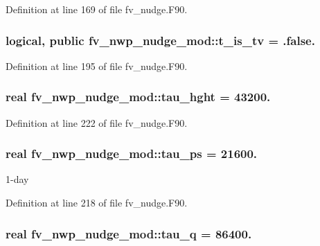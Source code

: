Definition at line 169 of file fv\-\_\-nudge.\-F90.

\subsubsection[{t\-\_\-is\-\_\-tv}]{\setlength{\rightskip}{0pt plus 5cm}logical, public fv\-\_\-nwp\-\_\-nudge\-\_\-mod\-::t\-\_\-is\-\_\-tv = .false.}\label{classfv__nwp__nudge__mod_a85c0708a93d6f338cfa8408215a55c3b}


Definition at line 195 of file fv\-\_\-nudge.\-F90.

\subsubsection[{tau\-\_\-hght}]{\setlength{\rightskip}{0pt plus 5cm}real fv\-\_\-nwp\-\_\-nudge\-\_\-mod\-::tau\-\_\-hght = 43200.\hspace{0.3cm}{\ttfamily [private]}}\label{classfv__nwp__nudge__mod_af7bc681ffc01fee847582a895acc391f}


Definition at line 222 of file fv\-\_\-nudge.\-F90.

\subsubsection[{tau\-\_\-ps}]{\setlength{\rightskip}{0pt plus 5cm}real fv\-\_\-nwp\-\_\-nudge\-\_\-mod\-::tau\-\_\-ps = 21600.\hspace{0.3cm}{\ttfamily [private]}}\label{classfv__nwp__nudge__mod_a351915ecd86a6b30a9cc359a9d83ec59}


1-\/day 



Definition at line 218 of file fv\-\_\-nudge.\-F90.

\subsubsection[{tau\-\_\-q}]{\setlength{\rightskip}{0pt plus 5cm}real fv\-\_\-nwp\-\_\-nudge\-\_\-mod\-::tau\-\_\-q = 86400.\hspace{0.3cm}{\ttfamily [private]}}\label{classfv__nwp__nudge__mod_a230458adc8e2b3649c9306bc76482b67}


